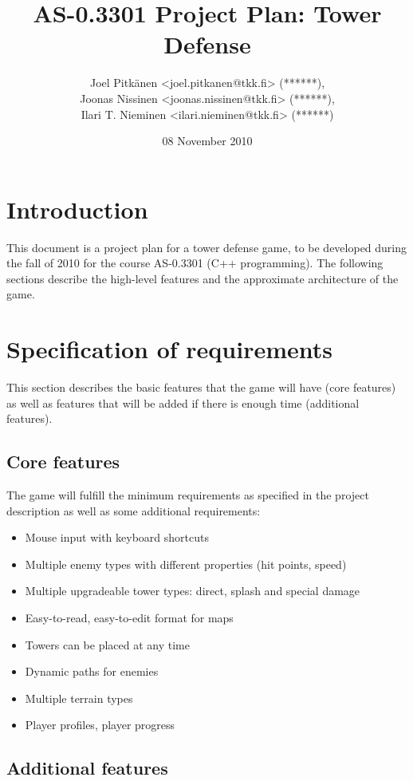 \documentclass[11pt]{article}
\title{AS-0.3301 Project Plan: Tower Defense}
\author{Joel Pitkänen <joel.pitkanen@tkk.fi> (******),\\ Joonas Nissinen <joonas.nissinen@tkk.fi> (******),\\ Ilari T. Nieminen <ilari.nieminen@tkk.fi> (******)}
\date{08 November 2010}
\begin{document}
\maketitle

\setcounter{tocdepth}{3}
\tableofcontents
\vspace*{1cm}

\section{Introduction}
\label{sec-1}


This document is a project plan for a tower defense game, to be
developed during the fall of 2010 for the course AS-0.3301 (C++
programming). The following sections describe the high-level features
and the approximate architecture of the game. 
\section{Specification of requirements}
\label{sec-2}


This section describes the basic features that the game will have
(core features) as well as features that will be added if there is
enough time (additional features).
\subsection{Core features}
\label{sec-2_1}


   The game will fulfill the minimum requirements as specified in the
   project description as well as some additional requirements:

\begin{itemize}
\item Mouse input with keyboard shortcuts
\item Multiple enemy types with different properties (hit points, speed)
\item Multiple upgradeable tower types: direct, splash and special damage
\item Easy-to-read, easy-to-edit format for maps
\item Towers can be placed at any time
\item Dynamic paths for enemies
\item Multiple terrain types
\item Player profiles, player progress
\end{itemize}
\subsection{Additional features}
\label{sec-2_2}
\end{document}
